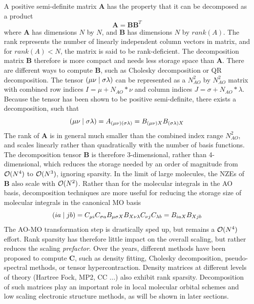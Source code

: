 A positive semi-definite matrix $\mathbf{A}$ has the property that it can be decomposed as a product 
\begin{equation}
\mathbf{A} = \mathbf{B} \mathbf{B}^T
\end{equation}
\noindent where $\mathbf{A}$ has dimensions $N$ by $N$, and $\mathbf{B}$ has dimensions $N$ by $rank(A)$. The rank represents the number of linearly independent column vectors in matrix, and for $rank(A) < N$, the matrix is said to  be rank-deficient. The decomposition matrix $\mathbf{B}$ therefore is more compact and needs less storage space than $\mathbf{A}$. There are different ways to compute $\mathbf{B}$, such as Cholesky decomposition or QR decomposition.
The tensor $\left( \mu\nu \mid \sigma\lambda \right)$ can be represented as a $N_{AO}^2$
by $N_{AO}^2$ matrix with combined row indices $I = \mu + N_{AO}*\nu$ and column indices $J = \sigma + N_{AO}*\lambda$. Because the tensor has been shown to be positive semi-definite, there exists a decomposition, such that
\begin{equation}
\left( \mu\nu \mid \sigma\lambda \right) = A_{(\mu\nu)(\sigma\lambda)} = B_{(\mu\nu)X} B_{(\sigma\lambda)X}
\end{equation}
\noindent The rank of $\mathbf{A}$ is in general much smaller than the combined index range $N_{AO}^2$, and scales linearly rather than quadratically with the number of basis functions. The decomposition tensor $\mathbf{B}$ is therefore 3-dimensional, rather than 4-dimensional, which reduces the storage needed by an order of magnitude from $\mathcal{O}(N^{4})$ to $\mathcal{O}(N^{3})$, ignoring sparsity. In the limit of large molecules, the NZEs of $\mathbf{B}$ also scale with $\mathcal{O}(N^{2})$. Rather than for the molecular integrals in the AO basis, decomposition techniques are more useful for reducing the storage size of molecular integrals in the canonical MO basis
\begin{equation}
\left( ia \mid jb \right) = C_{\mu i} C_{\sigma a} B_{\mu \sigma X} B_{X \nu \lambda} C_{\nu j} C_{\lambda b} = B_{iaX} B_{Xjb}
\end{equation} 
\noindent The AO-MO transformation step is drastically sped up, but remains a $\mathcal{O}(N^{4})$ effort. Rank sparsity has therefore little impact on the overall scaling, but rather reduces the scaling \emph{prefactor}. Over the years, different methods have been proposed to compute $\mathbf{C}$, such as density fitting, Cholesky decomposition, pseudo-spectral methods, or tensor hypercontraction.
Density matrices at different levels of theory (Hartree Fock, MP2, CC ...) also exhibit rank sparsity. Decomposition of such matrices play an important role in local molecular orbital schemes and low scaling electronic structure methods, as will be shown in later sections.

